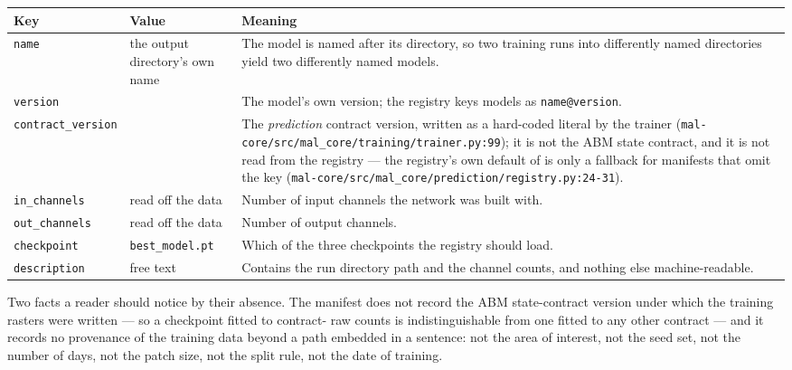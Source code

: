 \documentclass[11pt,a4paper]{article}
\newcommand{\codex}[1]{\texttt{#1}}
\newcommand{\StateContract}{\mskey{contracts.cogs_state}}
\begin{document}
\begin{center}
\begin{tabular}{@{}lp{3.2cm}p{8.2cm}@{}}
\toprule
Key & Value & Meaning \\
\midrule
\codex{name} & the output directory's own name & The model is named after its directory, so two training runs into differently named directories yield two differently named models. \\
\codex{version} & \codex{\codeconst{prediction.manifest_version}} & The model's own version; the registry keys models as \codex{name@version}. \\
\codex{contract\_\allowbreak{}version} & \codex{\codeconst{prediction.contract_version_manifest}} & The \emph{prediction} contract version, written as a hard-coded literal by the trainer (\codex{mal-core/\allowbreak{}src/\allowbreak{}mal\_\allowbreak{}core/\allowbreak{}training/\allowbreak{}trainer.py:99}); it is not the ABM state contract, and it is not read from the registry --- the registry's own default of \codex{\codeconst{prediction.contract_version_manifest}} is only a fallback for manifests that omit the key (\codex{mal-core/\allowbreak{}src/\allowbreak{}mal\_\allowbreak{}core/\allowbreak{}prediction/\allowbreak{}registry.py:24-31}). \\
\codex{in\_\allowbreak{}channels} & read off the data & Number of input channels the network was built with. \\
\codex{out\_\allowbreak{}channels} & read off the data & Number of output channels. \\
\codex{checkpoint} & \codex{best\_\allowbreak{}model.pt} & Which of the three checkpoints the registry should load. \\
\codex{description} & free text & Contains the run directory path and the channel counts, and nothing else machine-readable. \\
\bottomrule
\end{tabular}
\end{center}

Two facts a reader should notice by their absence. The manifest does not
record the ABM state-contract version under which the training rasters were
written --- so a checkpoint fitted to contract-\StateContract{} raw counts is
indistinguishable from one fitted to any other contract --- and it records no
provenance of the training data beyond a path embedded in a sentence: not the
area of interest, not the seed set, not the number of days, not the patch
size, not the split rule, not the date of training.
\end{document}

